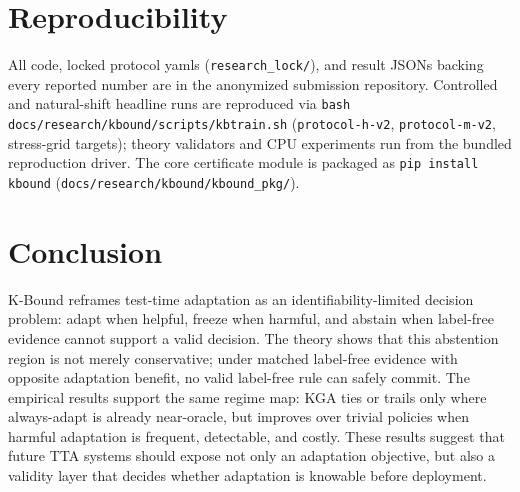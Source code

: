 \documentclass[conference]{IEEEtran}
\theoremstyle{plain}
\theoremstyle{definition}
\theoremstyle{remark}
\begin{document}
\section{Reproducibility}\label{sec:repro-main}
All code, locked protocol yamls (\texttt{research\_lock/}), and result JSONs backing every
reported number are in the anonymized submission repository. Controlled and natural-shift
headline runs are reproduced via \texttt{bash docs/research/kbound/scripts/kbtrain.sh}
(\texttt{protocol-h-v2}, \texttt{protocol-m-v2}, stress-grid targets); theory validators and
CPU experiments run from the bundled reproduction driver. The core certificate module is
packaged as \texttt{pip install kbound} (\texttt{docs/research/kbound/kbound\_pkg/}).

\section{Conclusion}
K-Bound reframes test-time adaptation as an identifiability-limited decision problem: adapt
when helpful, freeze when harmful, and abstain when label-free evidence cannot support a valid
decision. The theory shows that this abstention region is not merely conservative; under matched
label-free evidence with opposite adaptation benefit, no valid label-free rule can safely commit.
The empirical results support the same regime map: \textsc{KGA} ties or trails only where
always-adapt is already near-oracle, but improves over trivial policies when harmful adaptation
is frequent, detectable, and costly. These results suggest that future TTA systems should expose
not only an adaptation objective, but also a validity layer that decides whether adaptation is
knowable before deployment.

\appendix



\end{document}
